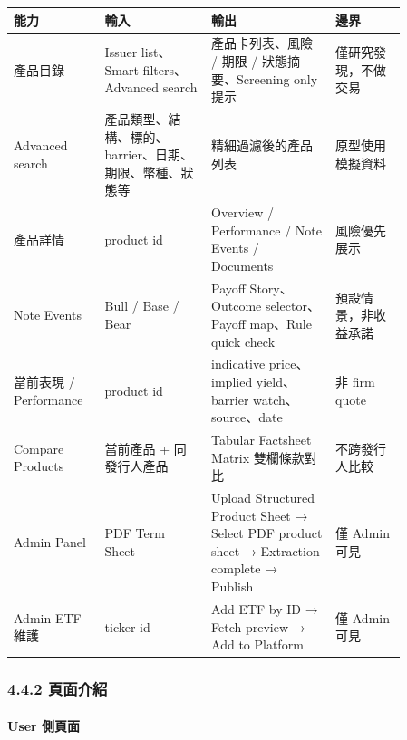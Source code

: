 \begingroup
\small
\begin{longtable}{L{0.18\linewidth}L{0.24\linewidth}L{0.28\linewidth}L{0.16\linewidth}}
\toprule
\textbf{能力} & \textbf{輸入} & \textbf{輸出} & \textbf{邊界} \\
\midrule
產品目錄 & Issuer list、Smart filters、Advanced search & 產品卡列表、風險 / 期限 / 狀態摘要、Screening only 提示 & 僅研究發現，不做交易 \\
Advanced search & 產品類型、結構、標的、barrier、日期、期限、幣種、狀態等 & 精細過濾後的產品列表 & 原型使用模擬資料 \\
產品詳情 & product id & Overview / Performance / Note Events / Documents & 風險優先展示 \\
Note Events & Bull / Base / Bear & Payoff Story、Outcome selector、Payoff map、Rule quick check & 預設情景，非收益承諾 \\
當前表現 / Performance & product id & indicative price、implied yield、barrier watch、source、date & 非 firm quote \\
Compare Products & 當前產品 + 同發行人產品 & Tabular Factsheet Matrix 雙欄條款對比 & 不跨發行人比較 \\
Admin Panel & PDF Term Sheet & Upload Structured Product Sheet → Select PDF product sheet → Extraction complete → Publish & 僅 Admin 可見 \\
Admin ETF 維護 & ticker id & Add ETF by ID → Fetch preview → Add to Platform & 僅 Admin 可見 \\
\bottomrule
\end{longtable}
\endgroup

\subsubsection{4.4.2 頁面介紹}

\paragraph{User 側頁面}






